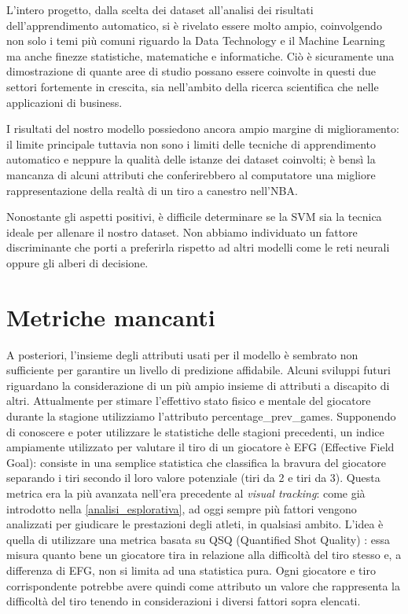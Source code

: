 L'intero progetto, dalla scelta dei dataset all'analisi dei risultati dell'apprendimento automatico, si è rivelato essere molto ampio, coinvolgendo non solo i temi più comuni riguardo la Data Technology e il Machine Learning ma anche finezze statistiche, matematiche e informatiche. Ciò è sicuramente una dimostrazione di quante aree di studio possano essere coinvolte in questi due settori fortemente in crescita, sia nell'ambito della ricerca scientifica che nelle applicazioni di business.
\par
I risultati del nostro modello possiedono ancora ampio margine di miglioramento: il limite principale tuttavia non sono i limiti delle tecniche di apprendimento automatico e neppure la qualità delle istanze dei dataset coinvolti; è bensì la mancanza di alcuni attributi che conferirebbero al computatore una migliore rappresentazione della realtà di un tiro a canestro nell'NBA.
\par
Nonostante gli aspetti positivi, è difficile determinare se la SVM sia la tecnica ideale per allenare il nostro dataset. Non abbiamo individuato un fattore discriminante che porti a preferirla rispetto ad altri modelli come le reti neurali oppure gli alberi di decisione.

\section{Metriche mancanti}
\label{metrichemancanti}
A posteriori, l'insieme degli attributi usati per il modello è sembrato non sufficiente per garantire un livello di predizione affidabile.
Alcuni sviluppi futuri riguardano la considerazione di un più ampio insieme di attributi a discapito di altri.
Attualmente per stimare l'effettivo stato fisico e mentale del giocatore durante la stagione utilizziamo l'attributo percentage\_prev\_games. Supponendo di conoscere e poter utilizzare le statistiche delle stagioni precedenti, un indice ampiamente utilizzato per valutare il tiro di un giocatore è EFG (Effective Field Goal): consiste in una semplice statistica che classifica la bravura del giocatore separando i tiri secondo il loro valore potenziale (tiri da 2 e tiri da 3).
Questa metrica era la più avanzata nell'era precedente al \textit{visual tracking}: come già introdotto nella \autoref{analisi_esplorativa}, ad oggi sempre più fattori vengono analizzati per giudicare le prestazioni degli atleti, in qualsiasi ambito.
L'idea è quella di utilizzare una metrica basata su QSQ (Quantified Shot Quality) \cite{chang2014quantifying}: essa misura quanto bene un giocatore tira in relazione alla difficoltà del tiro stesso e, a differenza di EFG, non si limita ad una statistica pura.
Ogni giocatore e tiro corrispondente potrebbe avere quindi come attributo un valore che rappresenta la difficoltà del tiro tenendo in considerazioni i diversi fattori sopra elencati.

